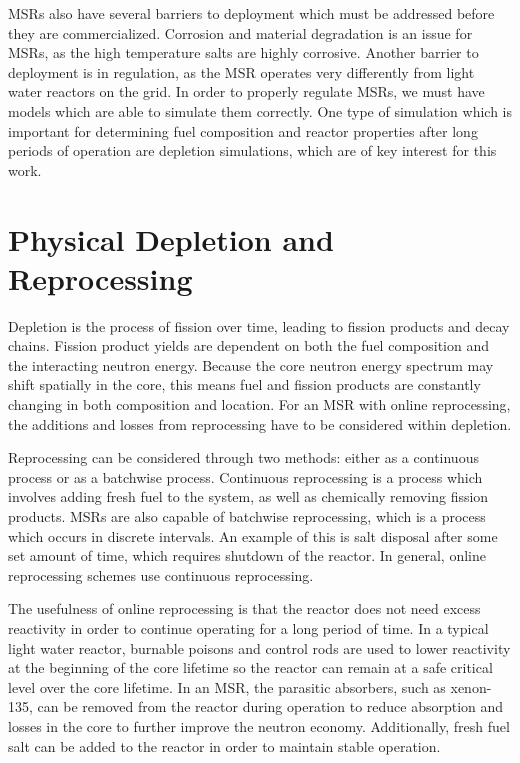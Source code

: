 MSRs also have several barriers to deployment which must be addressed before they are commercialized. Corrosion and material degradation is an issue for MSRs, as the high temperature salts are highly corrosive. Another barrier to deployment is in regulation, as the MSR operates very differently from light water reactors on the grid.
In order to properly regulate MSRs, we must have models which are able to simulate them correctly. One type of simulation which is important for determining fuel composition and reactor properties after long periods of operation are depletion simulations, which are of key interest for this work.

\section{Physical Depletion and Reprocessing}


Depletion is the process of fission over time, leading to fission products and decay chains.
Fission product yields are dependent on both the fuel composition and the interacting neutron energy.
Because the core neutron energy spectrum may shift spatially in the core, this means fuel and fission products are constantly changing in both composition and location.
For an MSR with online reprocessing, the additions and losses from reprocessing have to be considered within depletion.

Reprocessing can be considered through two methods: either as a continuous process or as a batchwise process.
Continuous reprocessing is a process which involves adding fresh fuel to the system, as well as chemically removing fission products.
MSRs are also capable of batchwise reprocessing, which is a process which occurs in discrete intervals.
An example of this is salt disposal after some set amount of time, which requires shutdown of the reactor.
In general, online reprocessing schemes use continuous reprocessing.

The usefulness of online reprocessing is that the reactor does not need excess reactivity in order to continue operating for a long period of time.
In a typical light water reactor, burnable poisons and control rods are used to lower reactivity at the beginning of the core lifetime so the reactor can remain at a safe critical level over the core lifetime.
In an MSR, the parasitic absorbers, such as xenon-135, can be removed from the reactor during operation to reduce absorption and losses in the core to further improve the neutron economy.
Additionally, fresh fuel salt can be added to the reactor in order to maintain stable operation.

